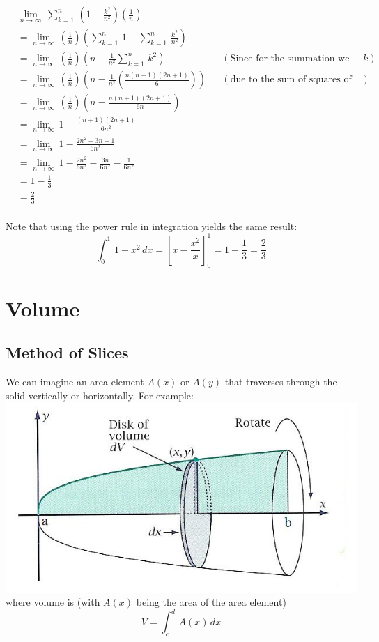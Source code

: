 \documentclass{article}
\begin{document}
\begin{align*}
    &\lim_{n \rightarrow \infty} \, \sum_{k=1}^{n} \, (1-\frac{k^2}{n^2})(\frac{1}{n}) \\
    &= \lim_{n \rightarrow \infty} \, (\frac{1}{n})( \sum_{k=1}^{n} \, 1 - \sum_{k=1}^{n} \, \frac{k^2}{n^2}) \\
    &= \lim_{n \rightarrow \infty} \, (\frac{1}{n})(n - \frac{1}{n^2} \sum_{k=1}^{n} \, k^2) && (\text{Since for the summation we only care about} \,k) \\
    &= \lim_{n \rightarrow \infty} \, (\frac{1}{n})(n - \frac{1}{n^2} (\frac{n(n+1)(2n+1)}{6})) && (\text{due to the sum of squares of natural numbers}) \\
    &= \lim_{n \rightarrow \infty} \, (\frac{1}{n})(n - \frac{n(n+1)(2n+1)}{6n}) \\
    &= \lim_{n \rightarrow \infty} \, 1 -\frac{(n+1)(2n+1)}{6n^2} \\
    &= \lim_{n \rightarrow \infty} \, 1 -\frac{2n^2+3n+1}{6n^2} \\
    &= \lim_{n \rightarrow \infty} \, 1 - \frac{2n^2}{6n^2} - \frac{3n}{6n^2} - \frac{1}{6n^2} \\
    &= 1 - \frac{1}{3} \\
    &= \frac{2}{3}
\end{align*}
\\
Note that using the power rule in integration yields the same result:
\[\int_{0}^{1} \, 1-x^2 \, dx = \left[x-\frac{x^2}{x}\right]_{0}^{1} = 1 - \frac{1}{3} = \frac{2}{3} \]

\section{Volume}
\subsection*{Method of Slices}
We can imagine an area element $A(x)$ or $A(y)$ that traverses through the solid vertically or horizontally. For example:
\\
\includegraphics[scale=0.6]{volume1.jpeg}
\\
where volume is (with $A(x)$ being the area of the area element)
\[V = \int_{c}^{d} \, A(x) \, dx \]
\end{document}
